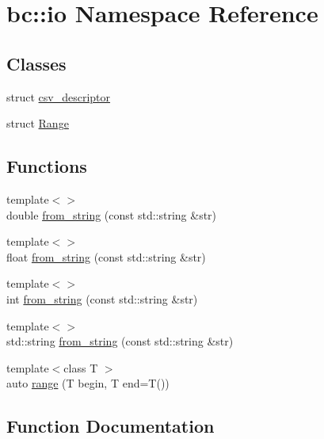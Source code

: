 \hypertarget{namespacebc_1_1io}{}\section{bc\+:\+:io Namespace Reference}
\label{namespacebc_1_1io}
\subsection*{Classes}
\begin{DoxyCompactItemize}
\item 
struct \hyperlink{structbc_1_1io_1_1csv__descriptor}{csv\+\_\+descriptor}
\item 
struct \hyperlink{structbc_1_1io_1_1Range}{Range}
\end{DoxyCompactItemize}
\subsection*{Functions}
\begin{DoxyCompactItemize}
\item 
{\footnotesize template$<$$>$ }\\double \hyperlink{namespacebc_1_1io_af515002771a8f5e210f98afe1a84777d}{from\+\_\+string} (const std\+::string \&str)
\item 
{\footnotesize template$<$$>$ }\\float \hyperlink{namespacebc_1_1io_a274a01eef477a0e229ff1f66e44641cd}{from\+\_\+string} (const std\+::string \&str)
\item 
{\footnotesize template$<$$>$ }\\int \hyperlink{namespacebc_1_1io_a3debf1fdb9e25a53feffe53a9d7059ec}{from\+\_\+string} (const std\+::string \&str)
\item 
{\footnotesize template$<$$>$ }\\std\+::string \hyperlink{namespacebc_1_1io_a6c9aff1cd2a85a667f45c7bbaac41848}{from\+\_\+string} (const std\+::string \&str)
\item 
{\footnotesize template$<$class T $>$ }\\auto \hyperlink{namespacebc_1_1io_a9665fd460e884af7baac638c11a92111}{range} (T begin, T end=T())
\end{DoxyCompactItemize}


\subsection{Function Documentation}
\mbox{\label{namespacebc_1_1io_af515002771a8f5e210f98afe1a84777d}} 
